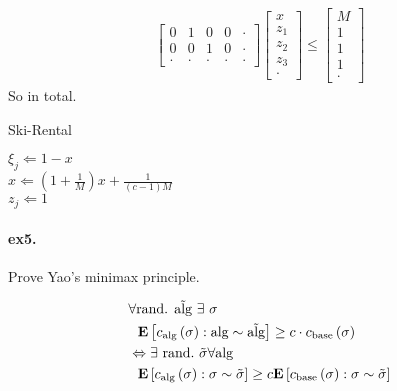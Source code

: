 \documentclass{article}
\begin{document}
\begin{multicols*}{2}
\begin{equation*}
\begin{split}
\begin{bmatrix}
	0 & 1 & 0 & 0 & \cdot \\
	0 & 0 & 1 & 0 & \cdot \\
	\cdot & \cdot & \cdot & \cdot & \cdot
      \end{bmatrix} 
      \begin{bmatrix}
	x \\
	z_{1} \\ 
	z_{2} \\
	z_{3} \\
	\cdot 
      \end{bmatrix} \le
      \begin{bmatrix}
	M \\
	1 \\ 
	1 \\
	1 \\
	\cdot 
      \end{bmatrix}
    \end{split}
  \end{equation*}
  So in total.

  \begin{algorithm}[H]
    \caption{Ski-Rental}
    \label{alg:three}
     {
       { 
	$ \xi_{j} \Leftarrow 1 - x$ \\
	$ x \Leftarrow \left( 1 + \frac{1}{M} \right) x + \frac{1}{\left( c - 1  \right) M } $ \\
	$ z_{j} \Leftarrow 1$
      }
    }
  \end{algorithm}
  \paragraph{ex5.} Prove Yao's minimax principle. 

  \begin{equation*}
    \begin{split}
      & \forall \text{rand. } \tilde{\text{alg}} \  \exists  \ \sigma  \\
      & \ \ \dalg{ \calg\left( \sigma \right) } \ge c \cdot   \cbase\left( \sigma \right) \\  
      & \Leftrightarrow \exists \ \text{rand.} \ \tilde{\sigma} \forall \text{alg} \\  
      & \ \ \dsig{  \calg\left( \sigma \right)  } \ge c \dsig{ \cbase \left( \sigma \right)  } 
    \end{split}
  \end{equation*}

\end{multicols*}
\end{document}
